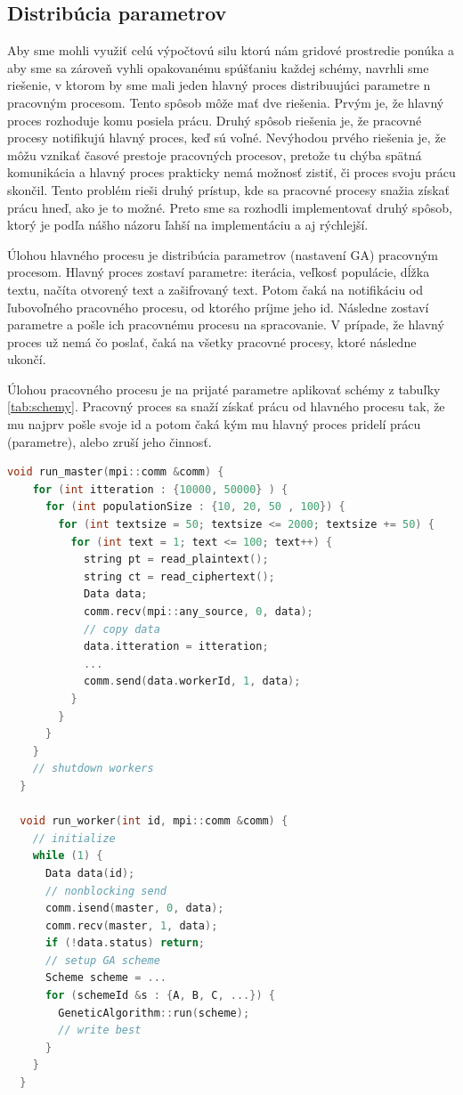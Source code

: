 \subsection{Distribúcia parametrov}
Aby sme mohli využiť celú výpočtovú silu ktorú nám gridové prostredie ponúka a aby sme sa zároveň vyhli opakovanému spúšťaniu každej schémy,
navrhli sme riešenie, v ktorom by sme mali jeden hlavný proces distribuujúci parametre n pracovným procesom.
Tento spôsob môže mať dve riešenia. Prvým je, že hlavný proces rozhoduje komu posiela prácu. Druhý spôsob riešenia je, že pracovné procesy
notifikujú hlavný proces, keď sú voľné. Nevýhodou prvého riešenia je, že môžu vznikať časové prestoje pracovných procesov,
pretože tu chýba spätná komunikácia a hlavný proces prakticky nemá možnosť zistiť, či proces svoju prácu skončil.
Tento problém rieši druhý prístup, kde sa pracovné procesy snažia získať prácu hneď, ako je to možné.
Preto sme sa rozhodli implementovať druhý spôsob, ktorý je podľa nášho názoru ľahší na implementáciu a aj rýchlejší.

Úlohou hlavného procesu je distribúcia parametrov (nastavení GA) pracovným procesom. Hlavný proces zostaví parametre: iterácia, veľkosť populácie, dĺžka textu,
načíta otvorený text a zašifrovaný text. Potom čaká na notifikáciu od ľubovoľného pracovného procesu, od ktorého príjme jeho id.
Následne zostaví parametre a pošle ich pracovnému procesu na spracovanie.
V prípade, že hlavný proces už nemá čo poslať, čaká na všetky pracovné procesy, ktoré následne ukončí.

Úlohou pracovného procesu je na prijaté parametre aplikovať schémy z tabuľky \ref{tab:schemy}.
Pracovný proces sa snaží získať prácu od hlavného procesu tak,
že mu najprv pošle svoje id a potom čaká kým mu hlavný proces pridelí prácu (parametre), alebo zruší jeho činnosť.

\begin{lstlisting}[language=c++, caption={Pseudokód ditribúcie parametrov GA}]
  void run_master(mpi::comm &comm) {
    for (int itteration : {10000, 50000} ) {
      for (int populationSize : {10, 20, 50 , 100}) {
        for (int textsize = 50; textsize <= 2000; textsize += 50) {
          for (int text = 1; text <= 100; text++) {
            string pt = read_plaintext();
            string ct = read_ciphertext();
            Data data;
            comm.recv(mpi::any_source, 0, data);
            // copy data
            data.itteration = itteration;
            ...
            comm.send(data.workerId, 1, data);
          }
        }
      } 
    }
    // shutdown workers
  }

  void run_worker(int id, mpi::comm &comm) {
    // initialize
    while (1) {
      Data data(id);
      // nonblocking send 
      comm.isend(master, 0, data);
      comm.recv(master, 1, data);
      if (!data.status) return;
      // setup GA scheme
      Scheme scheme = ...
      for (schemeId &s : {A, B, C, ...}) {
        GeneticAlgorithm::run(scheme);
        // write best
      }
    }
  }
\end{lstlisting}
